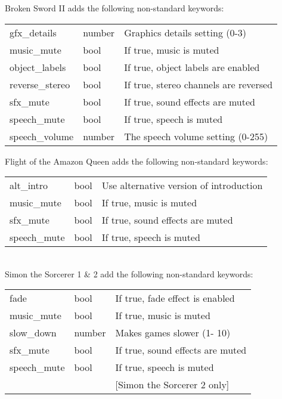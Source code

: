 Broken Sword II adds the following non-standard keywords:\\
\begin{tabular}[h]{lll}
        gfx\_details    &number  &Graphics details setting (0-3)\\
        music\_mute     &bool    &If true, music is muted\\
        object\_labels  &bool    &If true, object labels are enabled\\
        reverse\_stereo &bool    &If true, stereo channels are reversed\\
        sfx\_mute       &bool    &If true, sound effects are muted\\
        speech\_mute    &bool    &If true, speech is muted\\
        speech\_volume  &number  &The speech volume setting (0-255)\\
\end{tabular}

Flight of the Amazon Queen adds the following non-standard keywords:\\
\begin{tabular}[h]{lll}
        alt\_intro      &bool    &Use alternative version of introduction\\
        music\_mute     &bool    &If true, music is muted\\
        sfx\_mute       &bool    &If true, sound effects are muted\\
        speech\_mute    &bool    &If true, speech is muted\\
\end{tabular}\\

Simon the Sorcerer 1 \& 2 add the following non-standard keywords:\\
\begin{tabular}[h]{lll}
        fade            &bool    &If true, fade effect is enabled\\
        music\_mute     &bool    &If true, music is muted\\
        slow\_down      &number  &Makes games slower (1- 10)\\
        sfx\_mute       &bool    &If true, sound effects are muted\\
        speech\_mute    &bool    &If true, speech is muted\\
                        &        &[Simon the Sorcerer 2 only]\\
\end{tabular}
